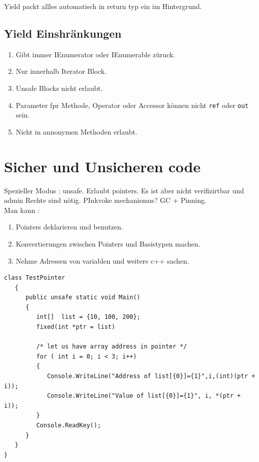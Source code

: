 \documentclass[a4paper,10pt]{scrartcl}
\begin{document}
Yield packt allles automatisch in return typ ein im Hintergrund.

\subsection{Yield Einshränkungen}

\begin{enumerate}
 \item Gibt immer IEnumerator oder IEnumerable züruck.
 \item Nur innerhalb Iterator Block.
 \item Unsafe Blocks nicht erlaubt.
 \item Parameter fpr Methode, Operator oder Accessor können nicht \texttt{ref} oder \texttt{out} sein.
 \item Nicht in annonymen Methoden erlaubt.
\end{enumerate}

\section{Sicher und Unsicheren code}
Spezieller Modus : unsafe. Erlaubt pointers. Es ist aber nicht verifizirtbar und admin Rechte sind nötig. PInkvoke mechanismus?
GC + Pinning.\\
Man kann : \\
\begin{enumerate}
 \item Pointers deklarieren und benutzen.
 \item Konvertierungen zwischen Pointers und Basistypen machen.
 \item Nehme Adressen von variablen und weitere c++ sachen.
\end{enumerate}

\begin{lstlisting}[caption=Unsafe Code Example]
 class TestPointer
   {
      public unsafe static void Main()
      {
         int[]  list = {10, 100, 200};
         fixed(int *ptr = list)

         /* let us have array address in pointer */
         for ( int i = 0; i < 3; i++)
         {
            Console.WriteLine("Address of list[{0}]={1}",i,(int)(ptr + i));
            Console.WriteLine("Value of list[{0}]={1}", i, *(ptr + i));
         }
         Console.ReadKey();
      }
   }
}
\end{lstlisting}
\end{document}
